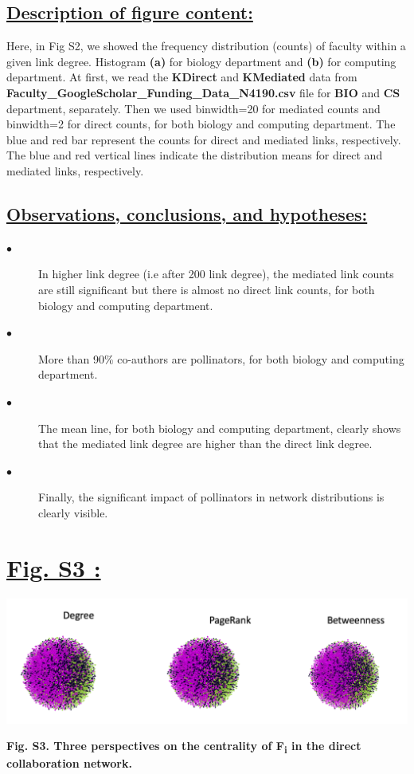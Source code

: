 \documentclass{article}\usepackage[]{graphicx}\usepackage[]{color}
\begin{document}
\subsection*{\underline{Description of figure content:}}
\par{Here, in Fig S2, we showed the frequency distribution (counts) of faculty within a given link degree. Histogram \textbf{(a)} for biology department and \textbf{(b)} for computing department. At first, we read the \textbf{KDirect} and \textbf{KMediated} data from \textbf{Faculty\_GoogleScholar\_Funding\_Data\_N4190.csv} file for \textbf{BIO} and \textbf{CS} department, separately. Then we used binwidth=20 for mediated counts and binwidth=2 for direct counts, for both biology and computing department. The blue and red bar represent the counts for direct and mediated links, respectively. The blue and red vertical lines indicate the distribution means for direct and mediated links, respectively.}
\subsection*{\underline{Observations, conclusions, and hypotheses:}}
\begin{description}
  \item[$\bullet$] In higher link degree (i.e after 200 link degree), the mediated link counts are still significant but there is almost no direct link counts, for both biology and computing department. 
  \item[$\bullet$] More than 90\% co-authors are pollinators, for both biology and computing department. 
  \item[$\bullet$] The mean line, for both biology and computing department, clearly shows that the mediated link degree are higher than the direct link degree. 
  \item[$\bullet$] Finally, the significant impact of pollinators in network distributions is clearly visible.
\end{description}

\newpage
\section*{\underline{Fig. S3 :}}
\begin{center}
\includegraphics[scale=0.7]{S3.png}
\newline
\par{\textbf{Fig. S3. Three perspectives on the centrality of F\textsubscript{i} in the direct collaboration network.}}
\end{center}
\end{document}
